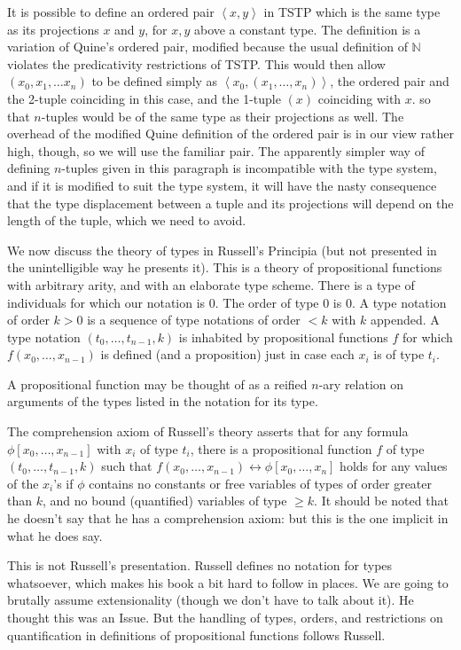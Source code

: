 \documentclass[12pt]{article}
\begin{document}
It is possible to define an ordered pair $\left<x,y\right>$ in TSTP which is the same type as its projections
$x$ and $y$, for $x,y$ above a constant type.  The definition is a variation of Quine's ordered pair, modified
because the usual definition of $\mathbb N$ violates the predicativity restrictions of TSTP.  This would then allow
$(x_0,x_1,\ldots x_n)$ to be defined simply as $\left<x_0,(x_1,\ldots,x_n)\right>$, the ordered pair and the 2-tuple coinciding in this case, and the 1-tuple $(x)$ coinciding with $x$. so that $n$-tuples would be of the same type as their projections as well.  The overhead of the modified Quine definition of the ordered pair is in our view rather high, though, so we will use the familiar pair.  The apparently simpler way of defining $n$-tuples given in this paragraph is
incompatible with the type system, and if it is modified to suit the type system, it will have the nasty consequence
that the type displacement between a tuple and its projections will depend on the length of the tuple, which we need to avoid.

We now discuss the theory of types in Russell's Principia (but not presented in the unintelligible way he presents it).  This is a theory of propositional functions with arbitrary arity, and with an elaborate type scheme.  There is a type of individuals for which our notation is 0.  The order of type 0 is 0.
A type notation of order $k>0$ is a sequence of type notations of order $<k$ with $k$ appended.  A type notation
$(t_0,\ldots,t_{n-1},k)$ is inhabited by propositional functions $f$ for which $f(x_0,\ldots,x_{n-1})$ is defined (and a proposition) just in case each $x_i$ is of type $t_i$. 

A propositional function may be thought of as a reified $n$-ary relation on arguments of the types listed in the notation for its type.

The comprehension axiom of Russell's theory asserts that for any formula $\phi[x_0,\ldots,x_{n-1}]$ with $x_i$ of type $t_i$, there is
a propositional function $f$ of type $(t_0,\ldots,t_{n-1},k)$ such that $f(x_0,\ldots,x_{n-1}) \leftrightarrow \phi[x_0,\ldots,x_n]$ holds for any values of the $x_i$'s if $\phi$ contains no constants or free variables of types of order
greater than $k$, and no bound (quantified) variables of type $\geq k$.  It should be noted that he doesn't say that he has a comprehension axiom:  but this is the one implicit in what he does say.

This is not Russell's presentation.  Russell defines no notation for types whatsoever, which makes his book a bit hard to follow in places.  We are going to brutally assume extensionality (though we don't have to talk about it).  He thought this was an Issue.  But the handling of types, orders, and restrictions on quantification in definitions of propositional functions follows Russell.
\end{document}
